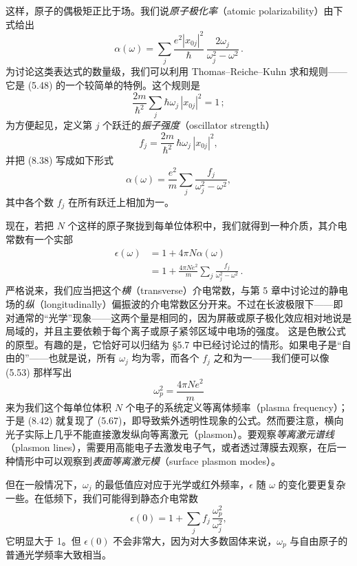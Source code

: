 这样，原子的偶极矩正比于场。我们说\emph{原子极化率}（atomic polarizability）由下式给出
\begin{equation*}
\alpha(\omega) = \sum_j \frac{e^2|x_{0j}|^2}{\hbar}\,\frac{2\omega_j}{\omega_j^2-\omega^2}\,.\tag{8.38}
\end{equation*}
为讨论这类表达式的数量级，我们可以利用 Thomas--Reiche--Kuhn 求和规则——它是 (5.48) 的一个较简单的特例。这个规则是
\begin{equation*}
\frac{2m}{\hbar^2}\sum_j \hbar\omega_j\,|x_{0j}|^2 = 1\,;\tag{8.39}
\end{equation*}
为方便起见，定义第 $j$ 个跃迁的\emph{振子强度}（oscillator strength）
\begin{equation*}
f_j = \frac{2m}{\hbar^2}\,\hbar\omega_j\,|x_{0j}|^2,\tag{8.40}
\end{equation*}
并把 (8.38) 写成如下形式
\begin{equation*}
\alpha(\omega) = \frac{e^2}{m}\sum_j \frac{f_j}{\omega_j^2-\omega^2},\tag{8.41}
\end{equation*}
其中各个数 $f_j$ 在所有跃迁上相加为一。

现在，若把 $N$ 个这样的原子聚拢到每单位体积中，我们就得到一种介质，其介电常数有一个实部
\begin{align*}
\epsilon(\omega) &= 1 + 4\pi N\alpha(\omega)\\
&= 1 + \frac{4\pi N e^2}{m}\sum_j \frac{f_j}{\omega_j^2-\omega^2}\,.\tag{8.42}
\end{align*}
严格说来，我们应当把这个\emph{横}（transverse）介电常数，与第 5 章中讨论过的静电场的\emph{纵}（longitudinally）偏振波的介电常数区分开来。不过在长波极限下——即对通常的“光学”现象——这两个量是相同的，因为屏蔽或原子极化效应相对地说是局域的，并且主要依赖于每个离子或原子紧邻区域中电场的强度。
这是色散公式的原型。有趣的是，它恰好可以归结为 \S 5.7 中已经讨论过的情形。如果电子是“自由的”——也就是说，所有 $\omega_j$ 均为零，而各个 $f_j$ 之和为一——我们便可以像 (5.53) 那样写出
\begin{equation*}
\omega_p^2 = \frac{4\pi N e^2}{m}\tag{8.43}
\end{equation*}
来为我们这个每单位体积 $N$ 个电子的系统定义等离体频率（plasma frequency）；于是 (8.42) 就复现了 (5.67)，即导致紫外透明性现象的公式。然而要注意，横向光子实际上几乎不能直接激发纵向等离激元（plasmon）。要观察\emph{等离激元谱线}（plasmon lines），需要用高能电子去激发电子气，或者透过薄膜去观察，在后一种情形中可以观察到\emph{表面等离激元模}（surface plasmon modes）。

但在一般情况下，$\omega_j$ 的最低值应对应于光学或红外频率，$\epsilon$ 随 $\omega$ 的变化要更复杂一些。在低频下，我们可能得到静态介电常数
\begin{equation*}
\epsilon(0) = 1 + \sum_j f_j\,\frac{\omega_p^2}{\omega_j^2},\tag{8.44}
\end{equation*}
它明显大于 1。但 $\epsilon(0)$ 不会非常大，因为对大多数固体来说，$\omega_p$ 与自由原子的普通光学频率大致相当。

